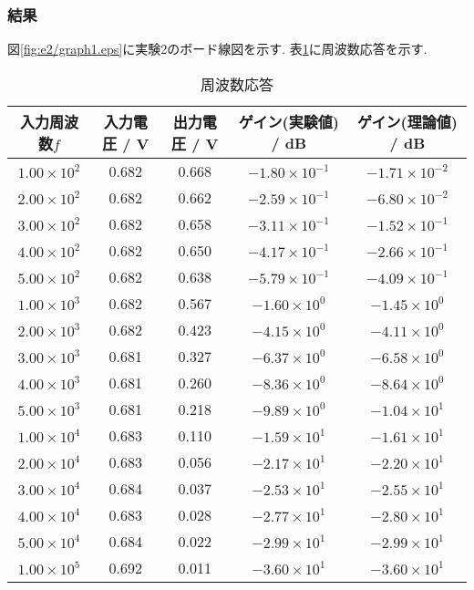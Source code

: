 \subsubsection{結果}
図\ref{fig:e2/graph1.eps}に実験2のボード線図を示す.
表\ref{tab:e2_outou}に周波数応答を示す.
\begin{table}[h]
  \caption{周波数応答}
  \label{tab:e2_outou}
  \centering
  \begin{tabular}{ccccc}
    \hline
    入力周波数$f$&入力電圧 / \si{\volt}&出力電圧 / \si{\volt}&ゲイン(実験値) / \si{\deci\bel}&ゲイン(理論値) / \si{\deci\bel}\\
    \hline \hline
    $1.00\times10^2$ & 0.682 & 0.668 & $-1.80\times10^{-1}$ & $-1.71\times10^{-2}$ \\
    $2.00\times10^2$ & 0.682 & 0.662 & $-2.59\times10^{-1}$ & $-6.80\times10^{-2}$ \\
    $3.00\times10^2$ & 0.682 & 0.658 & $-3.11\times10^{-1}$ & $-1.52\times10^{-1}$ \\
    $4.00\times10^2$ & 0.682 & 0.650 & $-4.17\times10^{-1}$ & $-2.66\times10^{-1}$ \\
    $5.00\times10^2$ & 0.682 & 0.638 & $-5.79\times10^{-1}$ & $-4.09\times10^{-1}$ \\
    $1.00\times10^3$ & 0.682 & 0.567 & $-1.60\times10^{0}$ & $-1.45\times10^{0}$ \\
    $2.00\times10^3$ & 0.682 & 0.423 & $-4.15\times10^{0}$ & $-4.11\times10^{0}$ \\
    $3.00\times10^3$ & 0.681 & 0.327 & $-6.37\times10^{0}$ & $-6.58\times10^{0}$ \\
    $4.00\times10^3$ & 0.681 & 0.260 & $-8.36\times10^{0}$ & $-8.64\times10^{0}$ \\
    $5.00\times10^3$ & 0.681 & 0.218 & $-9.89\times10^{0}$ & $-1.04\times10^{1}$ \\
    $1.00\times10^4$ & 0.683 & 0.110 & $-1.59\times10^{1}$ & $-1.61\times10^{1}$ \\
    $2.00\times10^4$ & 0.683 & 0.056 & $-2.17\times10^{1}$ & $-2.20\times10^{1}$ \\
    $3.00\times10^4$ & 0.684 & 0.037 & $-2.53\times10^{1}$ & $-2.55\times10^{1}$ \\
    $4.00\times10^4$ & 0.683 & 0.028 & $-2.77\times10^{1}$ & $-2.80\times10^{1}$ \\
    $5.00\times10^4$ & 0.684 & 0.022 & $-2.99\times10^{1}$ & $-2.99\times10^{1}$ \\
    $1.00\times10^5$ & 0.692 & 0.011 & $-3.60\times10^{1}$ & $-3.60\times10^{1}$ \\
    \hline
  \end{tabular}
\end{table}
\newpage

